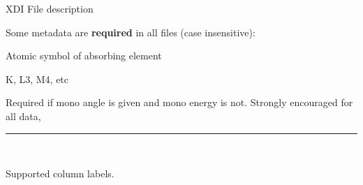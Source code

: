 \documentclass[final]{beamer}
\newcommand{\Color}[2]{{\textcolor{#1}{#2}}}
\newcommand{\Blue}[1]{{\Color{Blue}{\bf{#1}}}}
\begin{document}
\begin{frame}{}
\begin{columns}[t]
\begin{column}{.42\linewidth}
        \vspace{2mm}
        \begin{block}{\large XDI File description}

          \justifying
          Some metadata are \textbf{required} in all files (case insensitive):

         \begin{center}
           \begin{minipage}[t]{0.95\linewidth}
             \begin{description}[Mono]
             \item[\Blue{Element.symbol}]  Atomic symbol of absorbing element
             \item[\Blue{Element.edge}]    K, L3, M4, etc
             \item[\Blue{Mono.d\_spacing}]  Required if mono angle is given and mono energy is not.
               Strongly encouraged for all data,
             \end{description}
           \end{minipage}
         \end{center}

         \vspace{3mm}

          \hrule

          \vspace{3mm} {\ }

          Supported column labels.


\end{block}
\end{column}
\end{columns}
\end{frame}
\end{document}
